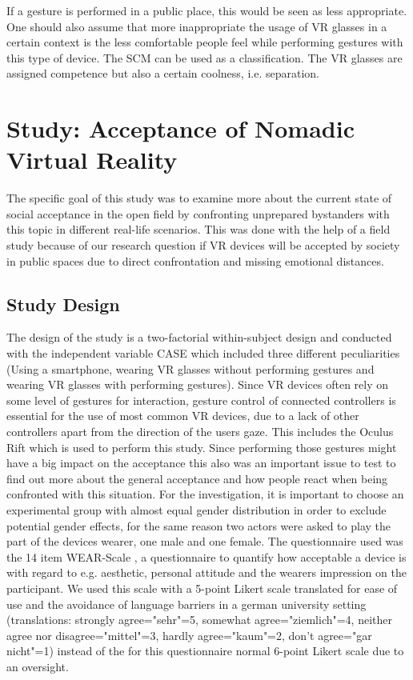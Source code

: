 \documentclass[sigchi]{acmart}
\begin{document}
If a gesture is performed in a public place, this would be seen as less appropriate. One should also assume that more inappropriate the usage of VR glasses in a certain context is the less comfortable people feel while performing gestures with this type of device. The SCM can be used as a classification. The VR glasses are assigned competence but also a certain coolness, i.e. separation.



\section{Study: Acceptance of Nomadic Virtual Reality}
The specific goal of this study was to examine more about the current state of social acceptance in the open field by confronting unprepared bystanders with this topic in different real-life scenarios. This was done with the help of a field study because of our research question if VR devices will be accepted by society in public spaces due to direct confrontation and missing emotional distances.

\subsection{Study Design}

The design of the study is a two-factorial within-subject design and conducted with the independent variable CASE which included three different peculiarities (Using a smartphone, wearing VR glasses without performing gestures and wearing VR glasses with performing gestures). Since VR devices often rely on some level of gestures for interaction, gesture control of connected controllers is essential for the use of most common VR devices, due to a lack of other controllers apart from the direction of the users gaze. This includes the Oculus Rift which is used to perform this study. Since performing those gestures might have a big impact on the acceptance this also was an important issue to test to find out more about the general acceptance and how people react when being confronted with this situation. For the investigation, it is important to choose an experimental group with almost equal gender distribution in order to exclude potential gender effects, for the same reason two actors were asked to play the part of the devices wearer, one male and one female.
The questionnaire used was the 14 item WEAR-Scale \cite{kelly2016wear}, a questionnaire to quantify how acceptable a device is with regard to e.g. aesthetic, personal attitude and the wearers impression on the participant. We used this scale with a 5-point Likert scale translated for ease of use and the avoidance of language barriers in a german university setting (translations: strongly agree="sehr"=5, somewhat agree="ziemlich"=4, neither agree nor disagree="mittel"=3, hardly agree="kaum"=2, don't agree="gar nicht"=1) instead of the for this questionnaire normal 6-point Likert scale due to an oversight.
\end{document}
